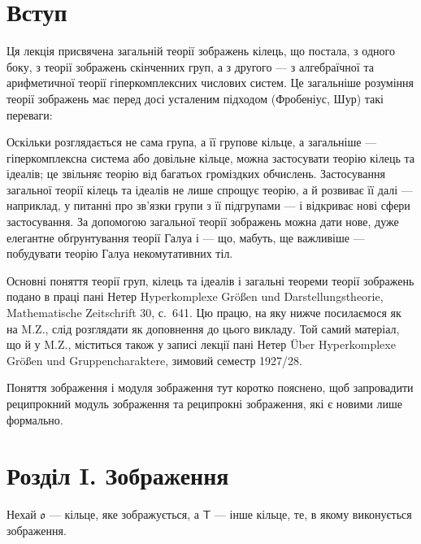 \documentclass[11pt]{article}
\newcommand{\foreign}[1]{#1}
\begin{document}
\clearpage
\section*{Вступ}\label{einleitung}

Ця лекція присвячена загальній теорії зображень кілець, що постала,
з одного боку, з теорії зображень скінченних груп, а з другого --- з
алгебраїчної та арифметичної теорії гіперкомплексних числових систем.
Це загальніше розуміння теорії зображень має перед досі усталеним
підходом (Фробеніус, Шур) такі переваги:

Оскільки розглядається не сама група, а її групове кільце, а
загальніше --- гіперкомплексна система або довільне кільце, можна
застосувати теорію кілець та ідеалів; це звільняє теорію від багатьох
громіздких обчислень. Застосування загальної теорії кілець та ідеалів
не лише спрощує теорію, а й розвиває її далі --- наприклад, у питанні
про зв'язки групи з її підгрупами --- і відкриває нові сфери
застосування. За допомогою загальної теорії зображень можна дати нове,
дуже елегантне обґрунтування теорії Галуа і --- що, мабуть, ще
важливіше --- побудувати теорію Галуа некомутативних тіл.

Основні поняття теорії груп, кілець та ідеалів і загальні теореми
теорії зображень подано в праці пані Нетер
\foreign{Hyperkomplexe Größen und Darstellungstheorie},
\foreign{Mathematische Zeitschrift} 30, с.~641. Цю працю, на яку нижче
посилаємося як на M.Z., слід розглядати як доповнення до цього викладу.
Той самий матеріал, що й у M.Z., міститься також у записі лекції пані
Нетер \foreign{Über Hyperkomplexe Größen und Gruppencharaktere},
зимовий семестр 1927/28.

Поняття зображення і модуля зображення тут коротко пояснено, щоб
запровадити реципрокний модуль зображення та реципрокні зображення,
які є новими лише формально.

\section*{Розділ I. Зображення}\label{kapitel-i.-darstellungen}

Нехай $\mathfrak{o}$ --- кільце, яке зображується, а $\mathsf T$ ---
інше кільце, те, в якому виконується зображення.
\end{document}
